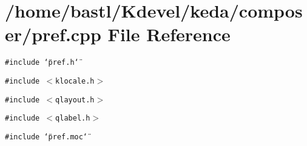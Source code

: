 \section{/home/bastl/Kdevel/keda/composer/pref.cpp File Reference}
\label{composer_2pref_8cpp}
{\tt \#include \char`\"{}pref.h\char`\"{}}\par
{\tt \#include $<$klocale.h$>$}\par
{\tt \#include $<$qlayout.h$>$}\par
{\tt \#include $<$qlabel.h$>$}\par
{\tt \#include \char`\"{}pref.moc\char`\"{}}\par
